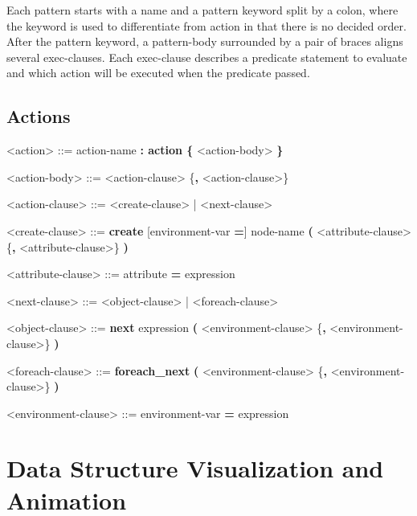 Each pattern starts with a name and a pattern keyword split by a colon, where the keyword is used to differentiate from action in that there is no decided order. After the pattern keyword, a pattern-body surrounded by a pair of braces aligns several exec-clauses. Each exec-clause describes a predicate statement to evaluate and which action will be executed when the predicate passed. 

\subsection {Actions}

\begin{center}
  \begin{minipage}{0.8\linewidth}
    \begin{grammar}
      <action> ::= action-name \textbf{: action \{} <action-body> \textbf{\}}

      <action-body> ::= <action-clause> \{\textbf{,} <action-clause>\}

      <action-clause> ::= <create-clause> | <next-clause>

      <create-clause> ::= \textbf{create} [environment-var \textbf{=}] node-name \textbf{(} <attribute-clause> \{\textbf{,} <attribute-clause>\} \textbf{)}

      <attribute-clause> ::= attribute \textbf{=} expression

      <next-clause> ::= <object-clause> | <foreach-clause>

      <object-clause> ::= \textbf{next} expression \textbf{(} <environment-clause> \{\textbf{,} <environment-clause>\} \textbf{)}

      <foreach-clause> ::= \textbf{foreach\_next} \textbf{(} <environment-clause> \{\textbf{,} <environment-clause>\} \textbf{)}

      <environment-clause> ::= environment-var \textbf{=} expression
    \end{grammar}
  \end{minipage}
\end{center}

\section {Data Structure Visualization and Animation}
